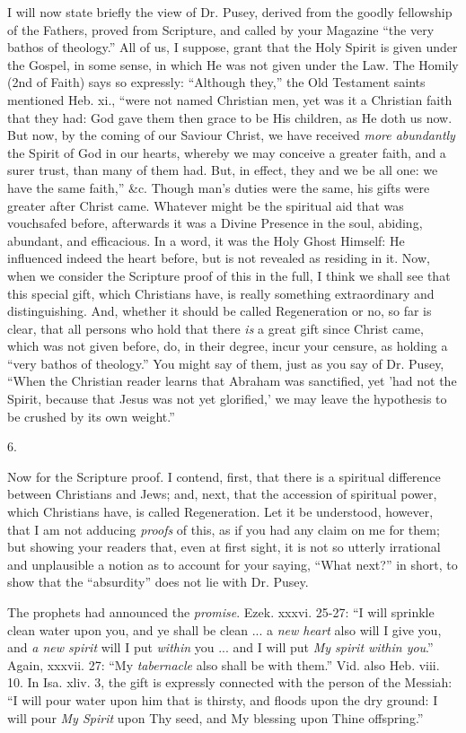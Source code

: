 I will now state briefly the view of Dr. Pusey,
derived from the goodly fellowship of the Fathers, proved from
Scripture, and called by your Magazine ``the very bathos of theology.''
All of us, I suppose, grant that the Holy Spirit is given under the
Gospel, in some sense, in which He was not given under the Law. The
Homily (2nd of Faith) says so expressly: ``Although they,'' the Old
Testament saints mentioned Heb. xi., ``were not named Christian men,
yet was it a Christian faith that they had: God gave them then grace
to be His children, as He doth us now. But now, by the coming of our
Saviour Christ, we have received \emph{more abundantly} the Spirit of
God in our hearts, whereby we may conceive a greater faith, and a
surer trust, than many of them had. But, in effect, they and we be all
one: we have the same faith,'' \&c. Though man's duties were the
same, his gifts were greater after Christ came. Whatever might be the
spiritual aid that was vouchsafed before, afterwards it was a Divine
Presence in the soul, abiding, abundant, and efficacious. In a word,
it was the Holy Ghost Himself: He influenced indeed the heart before,
but is not revealed as residing in it. Now, when we consider the
Scripture proof of this in the full, I think we shall see that this
special gift, which Christians have, is really something extraordinary
and distinguishing. And, whether it should be called Regeneration or
no, so far is clear, that all persons who hold that there \emph{is} a
great gift since Christ came, which was not given before, do, in their
degree, incur your censure, as holding a ``very bathos of theology.''
You might say of them, just as you say of Dr. Pusey, ``When the
Christian reader learns that Abraham was sanctified, yet 'had not the
Spirit, because that Jesus was not yet glorified,' we may leave the
hypothesis to be crushed by its own weight.''

6.

Now for the Scripture proof. I contend, first,
that there is a spiritual difference between Christians and Jews; and,
next, that the accession of spiritual power, which Christians have, is
called Regeneration. Let it be understood, however, that I am not
adducing \emph{proofs} of this, as if you had any claim on me for
them; but showing your readers that, even at first sight, it is not so
utterly irrational and unplausible a notion as to account for your
saying, ``What next?'' in short, to show that the ``absurdity'' does not
lie with Dr. Pusey.

The prophets had announced the \emph{promise}.
Ezek. xxxvi. 25-27: ``I will sprinkle clean water upon you, and ye
shall be clean ... a \emph{new heart} also will I give you, and \emph{a
new spirit} will I put \emph{within} you ... and I will put \emph{My
spirit within you}.'' Again, xxxvii. 27: ``My \emph{tabernacle} also
shall be with them.'' Vid. also Heb. viii. 10. In Isa. xliv. 3, the
gift is expressly connected with the person of the Messiah: ``I will
pour water upon him that is thirsty, and floods upon the dry ground: I
will pour \emph{My Spirit} upon Thy seed, and My blessing upon Thine
offspring.''

